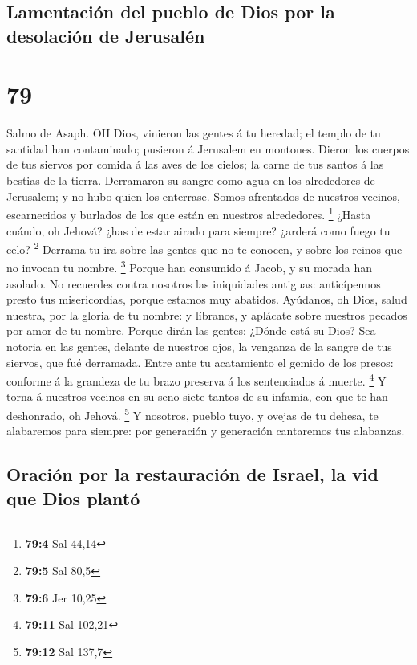 \hypertarget{lamentaciuxf3n-del-pueblo-de-dios-por-la-desolaciuxf3n-de-jerusaluxe9n}{%
\subsection{Lamentación del pueblo de Dios por la desolación de
Jerusalén}\label{lamentaciuxf3n-del-pueblo-de-dios-por-la-desolaciuxf3n-de-jerusaluxe9n}}

\hypertarget{section-78}{%
\section{79}\label{section-78}}

 Salmo de Asaph. OH Dios, vinieron las gentes á tu heredad;
el templo de tu santidad han contaminado; pusieron á Jerusalem en
montones.  Dieron los cuerpos de tus siervos por comida á
las aves de los cielos; la carne de tus santos á las bestias de la
tierra.  Derramaron su sangre como agua en los alrededores
de Jerusalem; y no hubo quien los enterrase.  Somos
afrentados de nuestros vecinos, escarnecidos y burlados de los que están
en nuestros alrededores. \footnote{\textbf{79:4} Sal 44,14} 
¿Hasta cuándo, oh Jehová? ¿has de estar airado para siempre? ¿arderá
como fuego tu celo? \footnote{\textbf{79:5} Sal 80,5} 
Derrama tu ira sobre las gentes que no te conocen, y sobre los reinos
que no invocan tu nombre. \footnote{\textbf{79:6} Jer 10,25}
 Porque han consumido á Jacob, y su morada han asolado.
 No recuerdes contra nosotros las iniquidades antiguas:
anticípennos presto tus misericordias, porque estamos muy abatidos.
 Ayúdanos, oh Dios, salud nuestra, por la gloria de tu
nombre: y líbranos, y aplácate sobre nuestros pecados por amor de tu
nombre.  Porque dirán las gentes: ¿Dónde está su Dios? Sea
notoria en las gentes, delante de nuestros ojos, la venganza de la
sangre de tus siervos, que fué derramada.  Entre ante tu
acatamiento el gemido de los presos: conforme á la grandeza de tu brazo
preserva á los sentenciados á muerte. \footnote{\textbf{79:11} Sal
  102,21}  Y torna á nuestros vecinos en su seno siete
tantos de su infamia, con que te han deshonrado, oh Jehová. \footnote{\textbf{79:12}
  Sal 137,7}  Y nosotros, pueblo tuyo, y ovejas de tu
dehesa, te alabaremos para siempre: por generación y generación
cantaremos tus alabanzas.

\hypertarget{oraciuxf3n-por-la-restauraciuxf3n-de-israel-la-vid-que-dios-plantuxf3}{%
\subsection{Oración por la restauración de Israel, la vid que Dios
plantó}\label{oraciuxf3n-por-la-restauraciuxf3n-de-israel-la-vid-que-dios-plantuxf3}}

